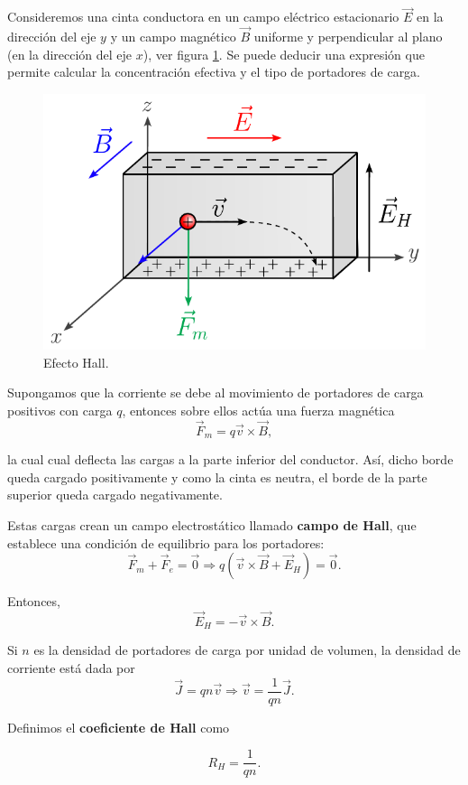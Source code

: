 Consideremos una cinta conductora en un campo eléctrico estacionario $\Vec{E}$ en la dirección del eje $y$ y un campo magnético $\vec{B}$ uniforme y perpendicular al plano (en la dirección del eje $x$), ver figura \ref{fig:Efecto-Hall}. Se puede deducir una expresión que permite calcular la concentración efectiva y el tipo de portadores de carga.

\begin{figure}[H]
    \centering
    \includegraphics[scale = 0.8]{Figuras/Efecto_Hall.pdf}
    \caption{Efecto Hall.}
    \label{fig:Efecto-Hall}
\end{figure}

Supongamos que la corriente se debe al movimiento de portadores de carga positivos con carga $q$, entonces sobre ellos actúa una fuerza magnética
$$\vec{F}_m = q\vec{v} \times \vec{B},$$

la cual cual deflecta las cargas a la parte inferior del conductor. Así, dicho borde queda cargado positivamente y como la cinta es neutra, el borde de la parte superior queda cargado negativamente.

Estas cargas crean un campo electrostático llamado \textbf{campo de Hall}, que establece una condición de equilibrio para los portadores:
$$\vec{F}_m  + \vec{F}_e = \vec{0} \Rightarrow q(\vec{v} \times \vec{B} + \vec{E}_H) = \vec{0}.$$

Entonces,
$$\vec{E}_H = - \vec{v} \times \vec{B}.$$

Si $n$ es la densidad de portadores de carga por unidad de volumen, la densidad de corriente está dada por
$$\vec{J} = qn \vec{v} \Rightarrow \vec{v} = \frac{1}{qn} \vec{J}.$$

Definimos el \textbf{coeficiente de Hall} como
\begin{shaded}
    $$R_H = \frac{1}{qn}.$$
\end{shaded}

